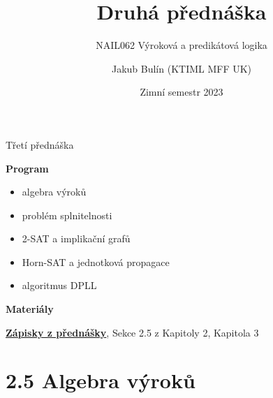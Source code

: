 \documentclass{beamer}
\title{Druhá přednáška}
\subtitle{NAIL062 Výroková a predikátová logika}
\author{Jakub Bulín (KTIML MFF UK)}
\date{Zimní semestr 2023}
\begin{document}
\frame{\titlepage}


\begin{frame}{Třetí přednáška}

    \textbf{Program}
        \begin{itemize}
            \item algebra výroků
            \item problém splnitelnosti
            \item 2-SAT a implikační grafů
            \item Horn-SAT a jednotková propagace
            \item algoritmus DPLL
        \end{itemize}        
    

    \textbf{Materiály}

        \href{https://github.com/jbulin-mff-uk/nail062/raw/main/lecture/lecture-notes/lecture-notes.pdf}{\alert{\textbf{Zápisky z přednášky}}}, Sekce 2.5 z Kapitoly 2, Kapitola 3

\end{frame}


\section{2.5 Algebra výroků}
\end{document}
